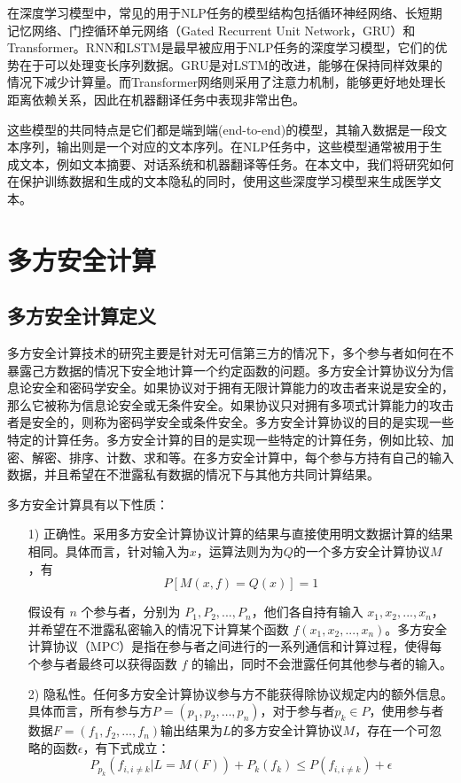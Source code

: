 在深度学习模型中，常见的用于NLP任务的模型结构包括循环神经网络、长短期记忆网络、门控循环单元网络（Gated Recurrent Unit Network，GRU）和Transformer。RNN和LSTM是最早被应用于NLP任务的深度学习模型，它们的优势在于可以处理变长序列数据。GRU是对LSTM的改进，能够在保持同样效果的情况下减少计算量。而Transformer网络则采用了注意力机制，能够更好地处理长距离依赖关系，因此在机器翻译任务中表现非常出色。

这些模型的共同特点是它们都是端到端(end-to-end)的模型，其输入数据是一段文本序列，输出则是一个对应的文本序列。在NLP任务中，这些模型通常被用于生成文本，例如文本摘要、对话系统和机器翻译等任务。在本文中，我们将研究如何在保护训练数据和生成的文本隐私的同时，使用这些深度学习模型来生成医学文本。

\section{多方安全计算}


\subsection{多方安全计算定义}

多方安全计算技术的研究主要是针对无可信第三方的情况下，多个参与者如何在不暴露己方数据的情况下安全地计算一个约定函数的问题。多方安全计算协议分为信息论安全和密码学安全。如果协议对于拥有无限计算能力的攻击者来说是安全的，那么它被称为信息论安全或无条件安全。如果协议只对拥有多项式计算能力的攻击者是安全的，则称为密码学安全或条件安全。多方安全计算协议的目的是实现一些特定的计算任务。多方安全计算的目的是实现一些特定的计算任务，例如比较、加密、解密、排序、计数、求和等。在多方安全计算中，每个参与方持有自己的输入数据，并且希望在不泄露私有数据的情况下与其他方共同计算结果。

多方安全计算具有以下性质：

\begin{itemize}
	\item [1)]
	正确性。采用多方安全计算协议计算的结果与直接使用明文数据计算的结果相同。具体而言，针对输入为$x$，运算法则为为$Q$的一个多方安全计算协议$M$，有
	$$P[M(x,f)=Q(x)]=1$$
	
	假设有 $n$ 个参与者，分别为 $P_1, P_2, ..., P_n$，他们各自持有输入 $x_1, x_2, ..., x_n$，并希望在不泄露私密输入的情况下计算某个函数 $f(x_1, x_2, ..., x_n)$。多方安全计算协议（MPC）是指在参与者之间进行的一系列通信和计算过程，使得每个参与者最终可以获得函数 $f$ 的输出，同时不会泄露任何其他参与者的输入。
	\item [2)]
	隐私性。任何多方安全计算协议参与方不能获得除协议规定内的额外信息。具体而言，所有参与方$P=(p_1, p_2, \dots, p_n)$，对于参与者$p_k\in P$，使用参与者数据$F=(f_1, f_2, \dots, f_n)$输出结果为$L$的多方安全计算协议$M$，存在一个可忽略的函数$\epsilon$，有下式成立：
	$$P_{p_k}(f_{i,i\neq k}|L=M(F))+P_k(f_k)\leq P(f_{i,i\neq k})+\epsilon$$
	
\end{itemize}



